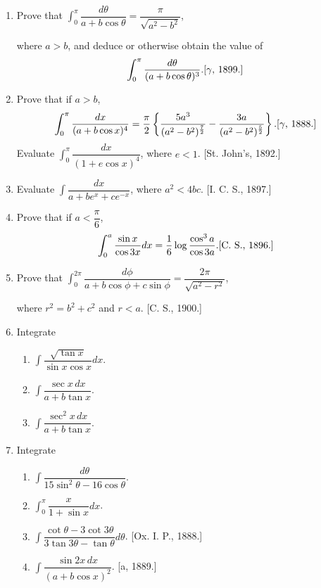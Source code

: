 \documentclass[11pt, a4paper]{article}
\newcommand{\source}[1]{\hfill\textnormal{[#1]}}
\begin{document}
\begin{enumerate}[leftmargin=2em]
\item Prove that $\displaystyle\int_0^\pi \dfrac{d\theta}{a+b\cos\theta}=\dfrac{\pi}{\sqrt{a^2-b^2}}$,

where $a>b$, and deduce or otherwise obtain the value of
\[
\int_0^\pi \dfrac{d\theta}{(a+b\cos\theta)^3}. \source{$\gamma$, 1899.}
\]

\item Prove that if $a>b$,
\[
\int_0^\pi \dfrac{dx}{(a+b\cos x)^4} = \dfrac\pi2\left\{\dfrac{5a^3}{(a^2-b^2)^{\frac72}}-\dfrac{3a}{(a^2-b^2)^{\frac52}}\right\}. \source{$\gamma$, 1888.}
\]
Evaluate $\displaystyle\int_0^\pi \dfrac{dx}{(1+e\cos x)^4}$, where $e<1$. \source{St. John's, 1892.}

\item Evaluate $\displaystyle\int \dfrac{dx}{a+be^x+ce^{-x}}$, where $a^2<4bc$. \source{I. C. S., 1897.}

\item Prove that if $a<\dfrac\pi6$,
\[
\int_0^a \dfrac{\sin x}{\cos 3x}dx = \dfrac16\log\dfrac{\cos^3a}{\cos3a}. \source{C. S., 1896.}
\]

\item Prove that $\displaystyle\int_0^{2\pi} \dfrac{d\phi}{a+b\cos\phi+c\sin\phi} = \dfrac{2\pi}{\sqrt{a^2-r^2}}$,

where $r^2=b^2+c^2$ and $r<a$. \source{C. S., 1900.}

\item Integrate
\begin{enumerate}[label=(\roman*)]
\item $\displaystyle\int \dfrac{\sqrt{\tan x}}{\sin x\cos x}dx$.
\item $\displaystyle\int \dfrac{\sec x\,dx}{a+b\tan x}$.
\item $\displaystyle\int \dfrac{\sec^2x\,dx}{a+b\tan x}$.
\end{enumerate}

\item Integrate
\begin{enumerate}[label=(\roman*)]
\item $\displaystyle\int \dfrac{d\theta}{15\sin^2\theta-16\cos\theta}$.
\item $\displaystyle\int_0^\pi \dfrac{x}{1+\sin x}dx$.
\item $\displaystyle\int \dfrac{\cot\theta-3\cot3\theta}{3\tan3\theta-\tan\theta}d\theta$. \source{Ox. I. P., 1888.}
\item $\displaystyle\int \dfrac{\sin2x\,dx}{(a+b\cos x)^2}$. \source{a, 1889.}
\end{enumerate}


\end{enumerate}
\end{document}
